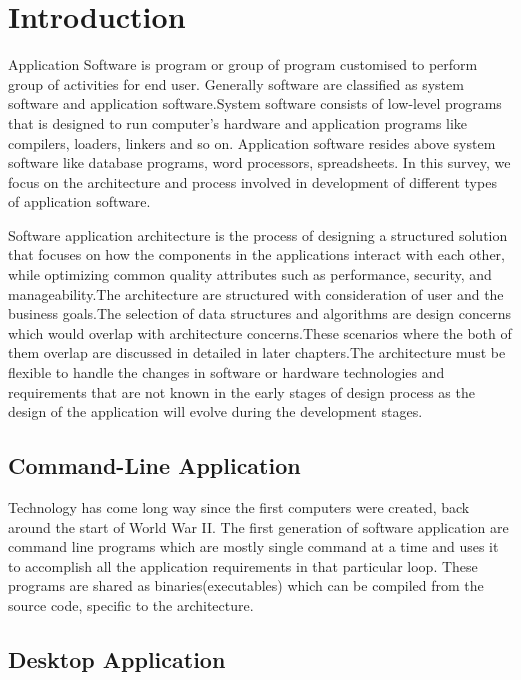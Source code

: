 \chapter{Introduction}\label{ch:introduction}
		Application	Software is program or group of program customised to perform group of activities for end user. Generally software are classified as system software and application software.System software consists of low-level programs that is designed to run computer's hardware and application programs like compilers, loaders, linkers and so on. Application software resides above system software like database programs, word processors, spreadsheets. In this survey, we focus on the architecture and process involved in development of different types of application software. 

		Software application architecture is the process of designing a structured solution that focuses on how the components in the applications interact with each other, while optimizing common quality attributes such as performance, security, and manageability.The architecture are structured with consideration of user and the business goals.The selection of data structures and algorithms are design concerns which would overlap with architecture concerns.These scenarios where the both of them overlap are discussed in detailed in later chapters.The architecture must be flexible to handle the changes in software or hardware technologies and requirements that are not known in the early stages of design process as the design of the application will evolve during the development stages.
			
	
\section{Command-Line Application}
			
			Technology has come long way since the first computers were created, back around the start of World War II. The first generation of software application are command line programs which are mostly single command at a time and uses it to accomplish all the application requirements in that particular loop. These programs are shared as binaries(executables) which can be compiled from the source code, specific to the architecture. 

\section{Desktop Application}
			
